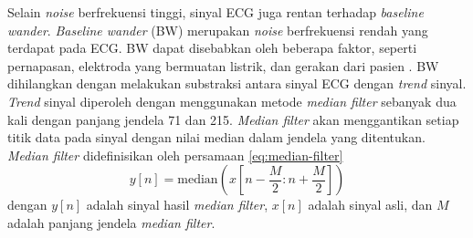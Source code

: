 

%
Selain \textit{noise} berfrekuensi tinggi, sinyal ECG juga rentan terhadap \textit{baseline wander}.
\textit{Baseline wander} (BW) merupakan \textit{noise} berfrekuensi rendah yang terdapat pada ECG.
BW dapat disebabkan oleh beberapa faktor, seperti pernapasan, elektroda yang bermuatan listrik, dan gerakan dari pasien \parencite{lenisComparisonBaselineWander2017}.
BW dihilangkan dengan melakukan substraksi antara sinyal ECG dengan \textit{trend} sinyal.
\textit{Trend} sinyal diperoleh dengan menggunakan metode \textit{median filter} sebanyak dua kali dengan panjang jendela 71 dan 215.
\textit{Median filter} akan menggantikan setiap titik data pada sinyal dengan nilai median dalam jendela yang ditentukan.
\textit{Median filter} didefinisikan oleh persamaan \ref{eq:median-filter}
\begin{equation}
    y[n] = \text{median}(x[n - \frac{M}{2} : n + \frac{M}{2}])
    \label{eq:median-filter}
\end{equation}
dengan $y[n]$ adalah sinyal hasil \textit{median filter}, $x[n]$ adalah sinyal asli, dan $M$ adalah panjang jendela \textit{median filter}.

